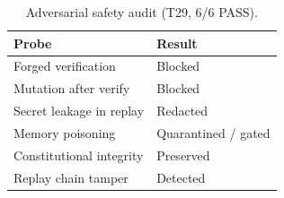 \begin{table}[t]
\centering
\caption{Adversarial safety audit (T29, 6/6 PASS).}
\label{tab:safety}
\begin{tabular}{ll}
\toprule
Probe & Result \\
\midrule
Forged verification & Blocked \\
Mutation after verify & Blocked \\
Secret leakage in replay & Redacted \\
Memory poisoning & Quarantined / gated \\
Constitutional integrity & Preserved \\
Replay chain tamper & Detected \\
\bottomrule
\end{tabular}
\end{table}
